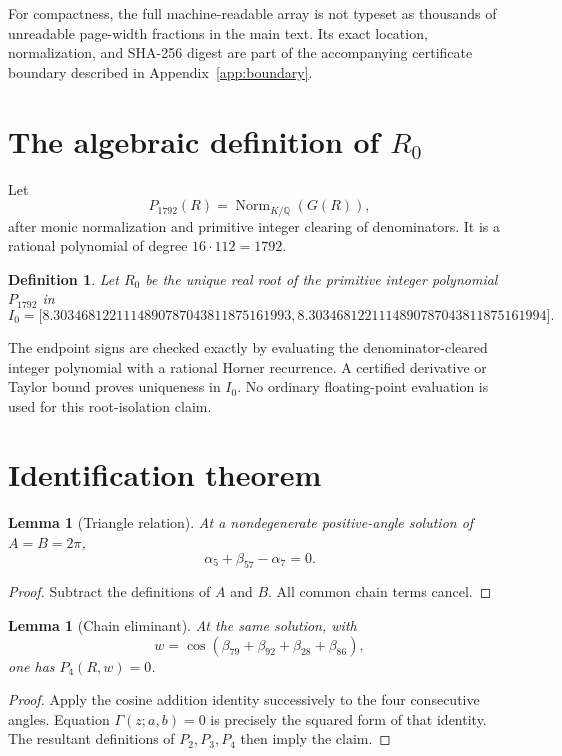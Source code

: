 \documentclass[11pt,a4paper]{article}
\newtheorem{lemma}[theorem]{Lemma}
\newtheorem{definition}[theorem]{Definition}
\newcommand{\Norm}{\operatorname{Norm}}
\begin{document}
For compactness, the full machine-readable array is not typeset as thousands
of unreadable page-width fractions in the main text.  Its exact location,
normalization, and SHA-256 digest are part of the accompanying certificate
boundary described in Appendix~\ref{app:boundary}.

\section{The algebraic definition of $R_0$}

Let
\[
 P_{1792}(R)=\Norm_{K/\mathbb{Q}}(G(R)),
\]
after monic normalization and primitive integer clearing of denominators.
It is a rational polynomial of degree $16\cdot112=1792$.

\begin{definition}
Let $R_0$ be the unique real root of the primitive integer polynomial
$P_{1792}$ in
\[
 I_0=\bigl[
 8.3034681221114890787043811875161993,
 8.3034681221114890787043811875161994
 \bigr].
\]
\end{definition}

The endpoint signs are checked exactly by evaluating the denominator-cleared
integer polynomial with a rational Horner recurrence.  A certified derivative
or Taylor bound proves uniqueness in $I_0$.  No ordinary floating-point
evaluation is used for this root-isolation claim.

\section{Identification theorem}

\begin{lemma}[Triangle relation]
At a nondegenerate positive-angle solution of $A=B=2\pi$,
\[
 \alpha_5+\beta_{57}-\alpha_7=0.
\]
\end{lemma}
\begin{proof}
Subtract the definitions of $A$ and $B$.  All common chain terms cancel.
\end{proof}

\begin{lemma}[Chain eliminant]
At the same solution, with
\[
 w=\cos(\beta_{79}+\beta_{92}+\beta_{28}+\beta_{86}),
\]
one has $P_4(R,w)=0$.
\end{lemma}
\begin{proof}
Apply the cosine addition identity successively to the four consecutive
angles.  Equation $\Gamma(z;a,b)=0$ is precisely the squared form of that
identity.  The resultant definitions of $P_2,P_3,P_4$ then imply the claim.
\end{proof}
\end{document}
